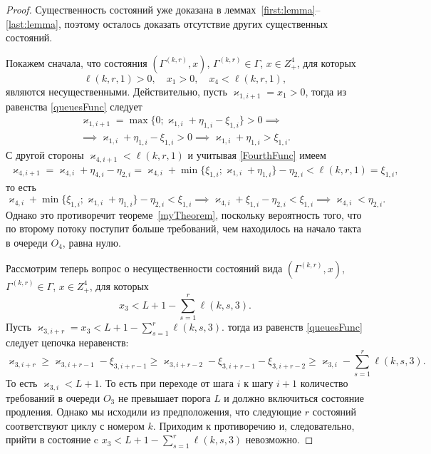\begin{proof}
Существенность состояний уже доказана в леммах~\ref{first:lemma}--\ref{last:lemma}, поэтому осталось доказать отсутствие других существенных состояний.

Покажем сначала,  что состояния $(\Gamma^{(k, r)}, x)$,  $\Gamma^{(k, r)}\in \Gamma$,  $x\in Z^4_+$,  для которых 
\begin{equation*}
    \ell(k, r, 1) > 0, \quad x_1>0,  \quad x_4 < \ell(k, r, 1), 
\end{equation*}
являются несущественными. Действительно,  пусть $\varkappa_{1, i+1}=x_1 > 0$,  тогда из равенства \eqref{queuesFunc} следует
\begin{multline*}
    \varkappa_{1,  i+1} = \max \{0; \varkappa_{1,  i} + \eta_{1,  i}-\xi_{1,  i}\} > 0 \implies \\ 
    \implies \varkappa_{1,  i} + \eta_{1,  i}-\xi_{1,  i} > 0 \implies  \varkappa_{1,  i} + \eta_{1,  i} > \xi_{1,  i}.
\end{multline*}
С другой стороны $\varkappa_{4,  i+1} < \ell(k,  r,  1)$ и учитывая \eqref{FourthFunc} имеем 
\begin{multline*}
    \varkappa_{4,  i+1} = \varkappa_{4,  i} + \eta_{4,  i} - \eta_{2,  i} =  \varkappa_{4,  i} + \min\{\xi_{1,  i}; \varkappa_{1,  i}+\eta_{1,  i}\} - \eta_{2,  i}  < \ell(k,  r,  1) = \xi_{1,  i}, 
\end{multline*}
то есть 
\begin{equation*}
     \varkappa_{4,  i} + \min\{\xi_{1,  i}; \varkappa_{1,  i}+\eta_{1,  i}\} - \eta_{2,  i} < \xi_{1,  i} \implies      \varkappa_{4, i} + \xi_{1,  i}- \eta_{2,  i} < \xi_{1,  i} \implies  \varkappa_{4,  i} < \eta_{2,  i}.
\end{equation*}
Однако это противоречит теореме~\eqref{myTheorem},  поскольку вероятность того,  что по второму потоку поступит больше требований,  чем находилось на начало такта в очереди $O_4$,  равна нулю.

Рассмотрим теперь вопрос о несущественности состояний вида $(\Gamma^{(k,  r)},  x)$,  $\Gamma^{(k,  r)}\in \Gamma$,  $x\in Z^4_+$,  для которых 
\begin{equation*}
    x_3< L + 1 - \sum_{s=1}^r \ell(k, s, 3).
\end{equation*}
Пусть $\varkappa_{3,  i+r}=x_3 < L + 1 - \sum_{s=1}^r \ell(k,  s,  3)$. тогда из равенств \eqref{queuesFunc} следует цепочка неравенств:
\begin{equation*}
    \varkappa_{3, i+r} \geqslant \varkappa_{3,  i+r-1} - \xi_{3,  i+r-1} \geqslant \varkappa_{3,  i+r-2} - \xi_{3,  i+r-1}- \xi_{3,  i+r-2} \geqslant \varkappa_{3,  i} - \sum_{s=1}^r \ell(k,  s,  3).
\end{equation*}
То есть $\varkappa_{3,  i} < L + 1$. То есть при переходе от шага $i$ к шагу  $i+1$ количество требований в очереди $O_3$ не превышает порога $L$ и должно включиться состояние продления. Однако мы исходили из предположения,  что следующие $r$ состояний соответствуют циклу с номером $k$. Приходим к противоречию и,  следовательно,  прийти в состояние c $x_3< L + 1 - \sum_{s=1}^r \ell(k,  s,  3)$ невозможно.
\end{proof}

